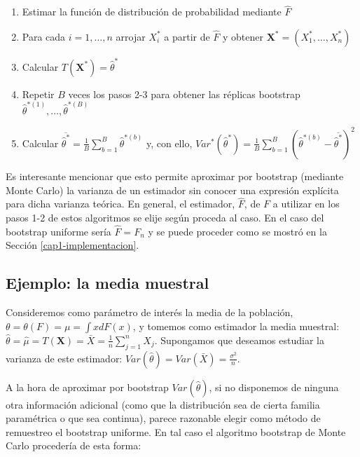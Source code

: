 \documentclass[]{book}
\theoremstyle{definition}
\theoremstyle{definition}
\theoremstyle{definition}
\theoremstyle{remark}
\begin{document}
\begin{enumerate}
\def\labelenumi{\arabic{enumi}.}
\item
  Estimar la función de distribución de probabilidad mediante
  \(\hat{ F}\)
\item
  Para cada \(i=1,\ldots ,n\) arrojar \(X_i^{\ast}\) a partir de
  \(\hat{F}\) y obtener
  \(\mathbf{X}^{\ast}=\left( X_1^{\ast}, \ldots, X_n^{\ast} \right)\)
\item
  Calcular \(T\left( \mathbf{X}^{\ast} \right) = \hat{\theta}^{\ast}\)
\item
  Repetir \(B\) veces los pasos 2-3 para obtener las réplicas bootstrap
  \(\hat{\theta}^{\ast (1)}, \ldots, \hat{\theta}^{\ast(B)}\)
\item
  Calcular
  \(\overline{\hat{\theta}^{\ast}}=\frac{1}{B}\sum_{b=1}^{B}\hat{ \theta}^{\ast (b)}\)
  y, con ello,
  \(Var^{\ast}\left( \hat{\theta}^{\ast} \right) =\frac{1}{B}\sum_{b=1}^{B}\left( \hat{\theta}^{\ast \left(b \right)}-\overline{\hat{\theta}^{\ast}} \right)^2\)
\end{enumerate}

Es interesante mencionar que esto permite aproximar por bootstrap
(mediante Monte Carlo) la varianza de un estimador sin conocer una
expresión explícita para dicha varianza teórica. En general, el
estimador, \(\hat{F}\), de \(F\) a utilizar en los pasos 1-2 de estos
algoritmos se elije según proceda al caso. En el caso del bootstrap
uniforme sería \(\hat{F}=F_n\) y se puede proceder como se mostró en la
Sección \ref{cap1-implementacion}.

\subsection{Ejemplo: la media muestral}\label{ejemplo-la-media-muestral}

Consideremos como parámetro de interés la media de la población,
\(\theta =\theta \left( F \right) =\mu =\int xdF\left( x \right)\), y
tomemos como estimador la media muestral:
\(\hat{\theta}=\hat{\mu}=T\left( \mathbf{X} \right) =\bar{X}=\frac{1}{n}\sum_{j=1}^{n}X_j\).
Supongamos que deseamos estudiar la varianza de este estimador:
\(Var\left( \hat{\theta} \right) =Var\left( \bar{X} \right) =\frac{\sigma^2}{n}\).

A la hora de aproximar por bootstrap \(Var\left( \hat{\theta} \right)\),
si no disponemos de ninguna otra información adicional (como que la
distribución sea de cierta familia paramétrica o que sea continua),
parece razonable elegir como método de remuestreo el bootstrap uniforme.
En tal caso el algoritmo bootstrap de Monte Carlo procedería de esta
forma:
\end{document}
